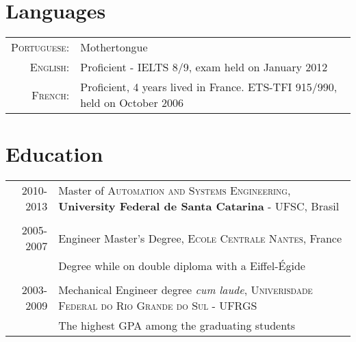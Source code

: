 \documentclass[a4paper,10pt]{article} %
\begin{document}
\section{Languages}

\begin{tabular}{rl}
\textsc{Portuguese:} & Mothertongue\\

\textsc{English:} & Proficient - IELTS 8/9, exam held on January 2012\\

\textsc{French:} & Proficient, 4 years lived in France. ETS-TFI
915/990, held on October 2006\\



\end{tabular}



\section{Education}
\begin{tabular}{rp{11cm}}	
\textsc{2010-2013} & Master of \textsc{Automation and Systems
  Engineering}, \textbf{University Federal de Santa Catarina} - UFSC,
Brasil\\

&\\


\textsc{2005-2007} & Engineer Master's Degree, \textsc{Ecole Centrale Nantes}, France\\
& Degree while on double diploma with a Eiffel-Égide\\
&\\


\textsc{2003-2009} & Mechanical Engineer degree \textit{cum laude},
\textsc{Univerisdade Federal do Rio Grande do Sul} - UFRGS \\
& The highest GPA among the graduating students\\

\end{tabular}
\end{document}
